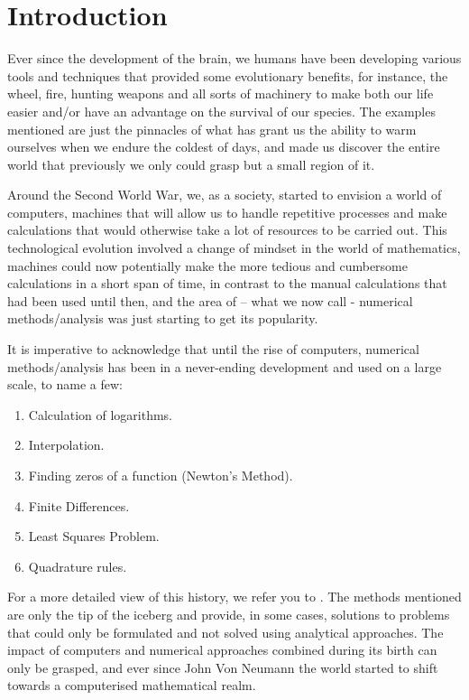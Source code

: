 \chapter{Introduction}

Ever since the development of the brain, we humans have been developing various tools and techniques that provided some evolutionary benefits, for instance, the wheel, fire, hunting weapons and all sorts of machinery to make both our life easier and/or have an advantage on the survival of our species. The examples mentioned are just the pinnacles of what has grant us the ability to warm ourselves when we endure the coldest of days, and made us discover the entire world that previously we only could grasp but a small region of it.

Around the Second World War, we, as a society, started to envision a world of computers, machines that will allow us to handle repetitive processes and make calculations that would otherwise take a lot of resources to be carried out. This technological evolution involved a change of mindset in the world of mathematics, machines could now potentially make the more tedious and cumbersome calculations in a short span of time, in contrast to the manual calculations that had been used until then, and the area of – what we now call - numerical methods/analysis was just starting to get its popularity.

It is imperative to acknowledge that until the rise of computers, numerical methods/analysis has been in a never-ending development and used on a large scale, to name a few:
\begin{enumerate}
    \item Calculation of logarithms.
    \item Interpolation.
    \item Finding zeros of a function (Newton's Method).
    \item Finite Differences.
    \item Least Squares Problem.
    \item Quadrature rules.
\end{enumerate}

For a more detailed view of this history, we refer you to \cite{goldstine2012history}. The methods mentioned are only the tip of the iceberg and provide, in some cases, solutions to problems that could only be formulated and not solved using analytical approaches. 
The impact of computers and numerical approaches combined during its birth can only be grasped, and ever since John Von Neumann the world started to shift towards a computerised mathematical realm. 

